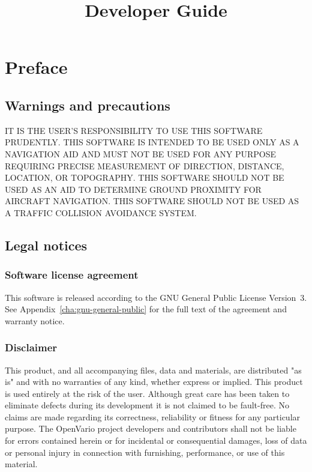 \documentclass[german,a4paper,11pt]{refrep}
\title{Developer Guide}%
\begin{document}
\sloppy

\maketitle

 
\begingroup
\setlength{\parskip}{0.1\baselineskip}
\tableofcontents
\endgroup


\chapter*{Preface}

\section*{Warnings and precautions}

\warning IT IS THE USER'S RESPONSIBILITY TO USE THIS SOFT\-WARE PRUDENTLY. THIS SOFTWARE IS 
INTENDED TO BE USED ONLY AS A NAVIGATION AID AND MUST NOT BE USED FOR ANY PURPOSE REQUIRING 
PRECISE MEASURE\-MENT OF DIRECTION, DISTANCE, LOCATION, OR TOPO\-GRAPHY. THIS SOFTWARE SHOULD 
NOT BE USED AS AN AID TO DETERMINE GROUND PROXIMITY FOR AIRCRAFT NAVIGATION. THIS SOFTWARE 
SHOULD NOT BE USED AS A TRAFFIC COLLISION AVOIDANCE SYSTEM.



\section*{Legal notices}

\subsection*{Software license agreement}

This software is released according to the GNU General Public License
Version~3.  See Appendix~\ref{cha:gnu-general-public} for the full
text of the agreement and warranty notice.

\subsection*{Disclaimer}
This product, and all accompanying files, data and materials, are
distributed "as is" and with no warranties of any kind, whether
express or implied.  This product is used entirely at the risk of the
user.  Although great care has been taken to eliminate defects during
its development it is not claimed to be fault-free. No claims are made
regarding its correctness, reliability or fitness for any particular
purpose.  The OpenVario project developers and contributors shall not be
liable for errors contained herein or for incidental or consequential
damages, loss of data or personal injury in connection with
furnishing, performance, or use of this material.
\end{document}
